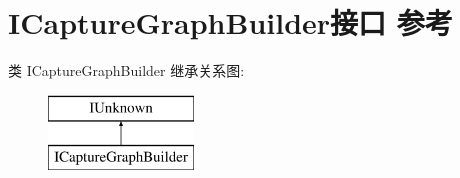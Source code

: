 \hypertarget{interface_i_capture_graph_builder}{}\section{I\+Capture\+Graph\+Builder接口 参考}
\label{interface_i_capture_graph_builder}
类 I\+Capture\+Graph\+Builder 继承关系图\+:\begin{figure}[H]
\begin{center}
\leavevmode
\includegraphics[height=2.000000cm]{interface_i_capture_graph_builder}
\end{center}
\end{figure}
